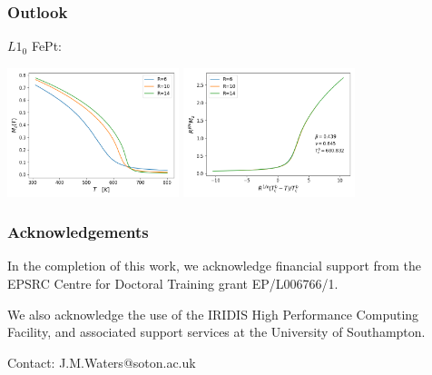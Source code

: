 \documentclass{beamer}
\begin{document}
\begin{frame}
	\frametitle{Outlook}
	$L1_0$ FePt: \vspace{5mm}

	\includegraphics[width=5cm]{Images/FePt/Ms} \hspace{1mm}
	\includegraphics[width=5cm]{Images/FePt/scaledM}
\end{frame}

\begin{frame}
	\frametitle{Acknowledgements}
	In the completion of this work, we acknowledge financial support from the EPSRC Centre for Doctoral Training grant EP/L006766/1. \newline

	We also acknowledge the use of the IRIDIS High Performance Computing Facility, and associated support services at the University of
Southampton. \newline

	Contact: J.M.Waters@soton.ac.uk
\end{frame}
\end{document}
